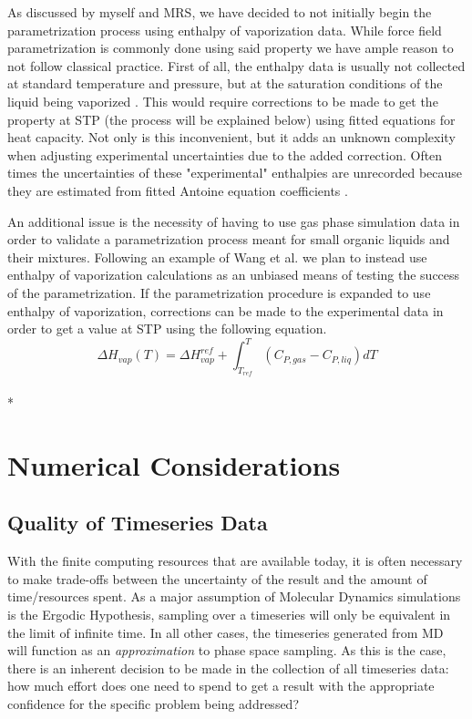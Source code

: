 \documentclass[9pt,bestpractices]{livecoms}
\begin{document}
As discussed by myself and MRS, we have decided to not initially begin the parametrization process using enthalpy of vaporization data. While force field parametrization is commonly done using said property we have ample reason to not follow classical practice. First of all, the enthalpy data is usually not collected at standard temperature and pressure, but at the saturation conditions of the liquid being vaporized \cite{chickos}.  This would require corrections to be made to get the property at STP (the process will be explained below) using fitted equations for heat capacity. Not only is this inconvenient, but it adds an unknown complexity when adjusting experimental uncertainties due to the added correction. Often times the uncertainties of these "experimental" enthalpies are unrecorded because they are estimated from fitted Antoine equation coefficients \cite{chickos}. 

An additional issue is the necessity of having to use gas phase simulation data in order to validate a parametrization process meant for small organic liquids and their mixtures. Following an example of Wang et al. \cite{FF99vdw} we plan to instead use enthalpy of vaporization calculations as an unbiased means of testing the success of the parametrization. If the parametrization procedure is expanded to use enthalpy of vaporization, corrections can be made to the experimental data in order to get a value at STP using the following equation.
\begin{equation}\Delta H_{vap}(T) = \Delta H_{vap}^{ref} + \int_{T_{ref}}^T \left(C_{P, gas} - C_{P, liq}\right) dT \end{equation}\\*

\section{Numerical Considerations}

\subsection{Quality of Timeseries Data}
With the finite computing resources that are available today, it is often necessary to make trade-offs between the uncertainty of the result and the amount of time/resources spent.  As a major assumption of Molecular Dynamics simulations is the Ergodic Hypothesis, sampling over a timeseries will only be equivalent in the limit of infinite time. In all other cases, the timeseries generated from MD will function as an \emph{approximation} to phase space sampling. As this is the case, there is an inherent decision to be made in the collection of all timeseries data: how much effort does one need to spend to get a result with the appropriate confidence for the specific problem being addressed? 
\end{document}
